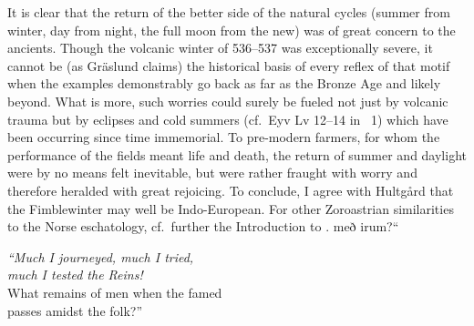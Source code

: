 {{It is clear that the return of the better side of the natural cycles (summer from winter, day from night, the full moon from the new) was of great concern to the ancients.  Though the volcanic winter of 536--537 was exceptionally severe, it cannot be (as Gräslund claims) the historical basis of every reflex of that motif when the examples demonstrably go back as far as the Bronze Age and likely beyond.  What is more, such worries could surely be fueled not just by volcanic trauma but by eclipses and cold summers (cf.~Eyv Lv 12--14 in \Skp\ 1) which have been occurring since time immemorial.  To pre-modern farmers, for whom the performance of the fields meant life and death, the return of summer and daylight were by no means felt inevitable, but were rather fraught with worry and therefore heralded with great rejoicing.
To conclude, I agree with Hultgård that the Fimblewinter may well be Indo-European.  For other Zoroastrian similarities to the Norse eschatology, cf.~further the Introduction to .}} með irum?“\eva

\bvb{}%
\emph{“Much I journeyed, much I tried, \\
\ind much I tested the Reins!} \\
What remains of men when the famed  \\
\ind passes amidst the folk?”\evb\evg


